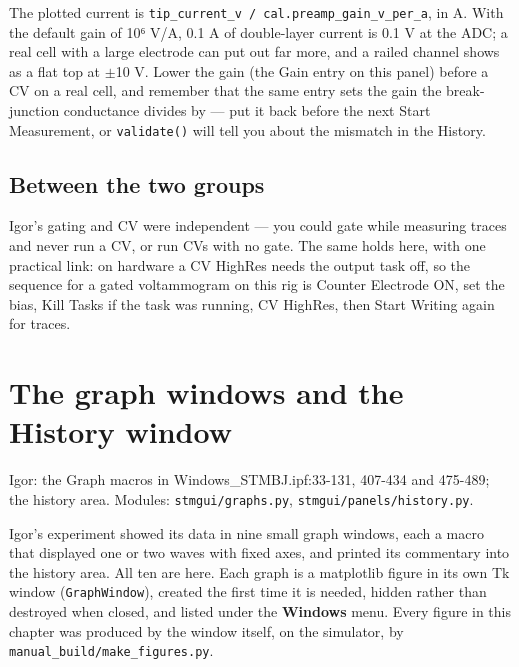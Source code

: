 The plotted current is \texttt{tip\_\discretionary{}{}{}current\_\discretionary{}{}{}v /\discretionary{}{}{} cal.\discretionary{}{}{}preamp\_\discretionary{}{}{}gain\_\discretionary{}{}{}v\_\discretionary{}{}{}per\_\discretionary{}{}{}a}, in \textmu{}A. With the default gain of 10⁶ V/A, 0.1 \textmu{}A of double-layer current is 0.1 V at the ADC; a real cell with a large electrode can put out far more, and a railed channel shows as a flat top at $\pm$10 V. Lower the gain (the Gain entry on this panel) before a CV on a real cell, and remember that the same entry sets the gain the break-junction conductance divides by --- put it back before the next Start Measurement, or \texttt{validate()} will tell you about the mismatch in the History.

\section{Between the two groups}

Igor's gating and CV were independent --- you could gate while measuring traces and never run a CV, or run CVs with no gate. The same holds here, with one practical link: on hardware a CV HighRes needs the output task off, so the sequence for a gated voltammogram on this rig is Counter Electrode ON, set the bias, Kill Tasks if the task was running, CV HighRes, then Start Writing again for traces.

\setcounter{chapter}{44}
\chapter{The graph windows and the History window}

\begin{keybox}\small Igor: the Graph macros in Windows\_STMBJ.ipf:33-131, 407-434 and 475-489; the history area. Modules: \texttt{stmgui/\discretionary{}{}{}graphs.\discretionary{}{}{}py}, \texttt{stmgui/\discretionary{}{}{}panels/\discretionary{}{}{}history.\discretionary{}{}{}py}.\end{keybox}

Igor's experiment showed its data in nine small graph windows, each a macro that displayed one or two waves with fixed axes, and printed its commentary into the history area. All ten are here. Each graph is a matplotlib figure in its own Tk window (\texttt{Graph\discretionary{}{}{}Window}), created the first time it is needed, hidden rather than destroyed when closed, and listed under the \textbf{Windows} menu. Every figure in this chapter was produced by the window itself, on the simulator, by \texttt{manual\_\discretionary{}{}{}build/\discretionary{}{}{}make\_\discretionary{}{}{}figures.\discretionary{}{}{}py}.

